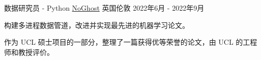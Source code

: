 \begin{cventries}
\cventry
    {数据研究员 - Python} %
    {\href{https://www.noghost.co.uk/}{NoGhost}} %
    {英国伦敦} %
    {2022年6月 - 2022年9月} %
    {
    \begin{cvitems} %
        \item {构建多进程数据管道，改进并实现最先进的机器学习论文。}
        \item {作为 UCL 硕士项目的一部分，整理了一篇获得优等荣誉的论文，由 UCL 的工程师和教授评价。}
    \end{cvitems}
    }

\end{cventries}
